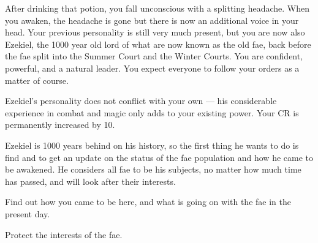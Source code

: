 \documentclass[char]{guildcamp2}
\begin{document}
\name{\cEzekiel{}}

After drinking that potion, you fall unconscious with a splitting headache. When you awaken, the headache is gone but there is now an additional voice in your head. Your previous personality is still very much present, but you are now also Ezekiel, the 1000 year old lord of what are now known as the old fae, back before the fae split into the Summer Court and the Winter Courts. You are confident, powerful, and a natural leader. You expect everyone to follow your orders as a matter of course.

Ezekiel's personality does not conflict with your own --- his considerable experience in combat and magic only adds to your existing power. Your CR is permanently increased by 10.

Ezekiel is 1000 years behind on his history, so the first thing he wants to do is find \cTreeFae{} and \cBabyFae{} to get an update on the status of the fae population and how he came to be awakened. He considers all fae to be his subjects, no matter how much time has passed, and will look after their interests.

\begin{itemz}[Goals]
  \item Find out how you came to be here, and what is going on with the fae in the present day.
  \item Protect the interests of the fae.
\end{itemz}
\end{document}
